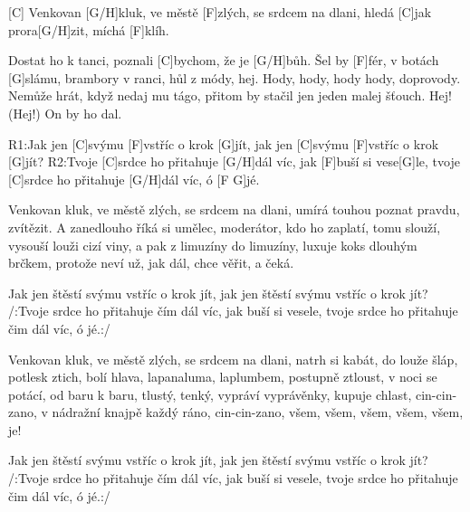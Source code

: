 
[C] Venkovan [G/H]kluk, ve městě [F]zlých,
se srdcem na dlani,
hledá [C] jak prora[G/H]zit,
míchá [F]klíh.

Dostat ho k tanci,
poznali [C]bychom, že je [G/H]bůh.
Šel by [F]fér, v botách [G]slámu,
brambory v ranci, hůl z módy, hej.
Hody, hody, hody hody, doprovody.
Nemůže hrát,
když nedaj mu tágo, přitom by stačil
jen jeden malej šťouch.
Hej! (Hej!)  On by ho dal. 

R1:Jak jen [C]svýmu [F]vstříc o krok [G]jít,
jak jen [C]svýmu [F]vstříc o krok [G]jít?
R2:Tvoje [C]srdce ho přitahuje [G/H] dál víc,
jak [F]buší si vese[G]le,
tvoje [C]srdce ho přitahuje [G/H] dál víc, ó [F G]jé.

Venkovan kluk, ve městě zlých,
se srdcem na dlani,
umírá touhou poznat pravdu, zvítězit.
A zanedlouho říká si umělec, moderátor,
kdo ho zaplatí, tomu slouží,
vysouší louži cizí viny,
a pak z limuzíny do limuzíny,
luxuje koks dlouhým brčkem,
protože neví už, jak dál,
chce věřit, a čeká.

Jak jen štěstí svýmu vstříc o krok jít,
jak jen štěstí svýmu vstříc o krok jít?
/:Tvoje srdce ho přitahuje čím dál víc,
jak buší si vesele,
tvoje srdce ho přitahuje čim dál víc, ó jé.:/

Venkovan kluk, ve městě zlých,
se srdcem na dlani,
natrh si kabát, do louže šláp,
potlesk ztich, bolí hlava,
lapanaluma, laplumbem,
postupně ztloust, v noci se potácí,
od baru k baru, tlustý, tenký,
vypráví vyprávěnky, kupuje chlast,
cin-cin-zano, v nádražní knajpě
každý ráno, cin-cin-zano,
všem, všem, všem, všem, všem, je!

Jak jen štěstí svýmu vstříc o krok jít,
jak jen štěstí svýmu vstříc o krok jít?
/:Tvoje srdce ho přitahuje čím dál víc,
jak buší si vesele,
tvoje srdce ho přitahuje čim dál víc, ó jé.:/
